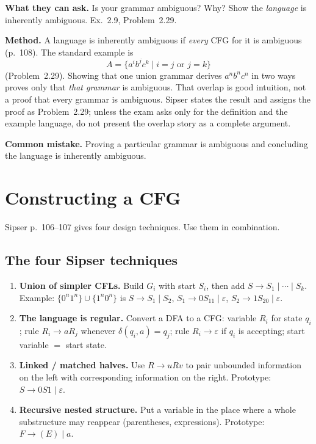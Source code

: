 \documentclass[11pt,a4paper]{article}
\newcommand{\eps}{\varepsilon}
\begin{document}
\textbf{What they can ask.}
Is your grammar ambiguous? Why? Show the \emph{language} is
inherently ambiguous. Ex.~2.9, Problem~2.29.

\textbf{Method.}
A language is inherently ambiguous if \emph{every} CFG for it is
ambiguous (p.~108). The standard example is
\[
  A=\{a^ib^jc^k\mid i=j\text{ or }j=k\}
\]
(Problem~2.29). Showing that one union grammar derives
$a^nb^nc^n$ in two ways proves only that \emph{that grammar} is
ambiguous. That overlap is good intuition, not a proof that every
grammar is ambiguous. Sipser states the result and assigns the
proof as Problem~2.29; unless the exam asks only for the
definition and the example language, do not present the overlap
story as a complete argument.

\textbf{Common mistake.}
Proving a particular grammar is ambiguous and concluding the
language is inherently ambiguous.

\section{Constructing a CFG}
\label{type:cfg-design}

Sipser p.~106--107 gives four design techniques. Use them in
combination.

\subsection{The four Sipser techniques}

\begin{enumerate}
  \item \textbf{Union of simpler CFLs.} Build $G_i$ with start
        $S_i$, then add $S\to S_1\mid\cdots\mid S_k$.
        Example:
        $\{0^n1^n\}\cup\{1^n0^n\}$ is
        $S\to S_1\mid S_2$, $S_1\to 0S_11\mid\eps$,
        $S_2\to 1S_20\mid\eps$.
  \item \textbf{The language is regular.} Convert a DFA to a CFG:
        variable $R_i$ for state $q_i$; rule $R_i\to aR_j$ whenever
        $\delta(q_i,a)=q_j$; rule $R_i\to\eps$ if $q_i$ is accepting;
        start variable $=$ start state.
  \item \textbf{Linked / matched halves.} Use $R\to uRv$ to pair
        unbounded information on the left with corresponding
        information on the right. Prototype: $S\to 0S1\mid\eps$.
  \item \textbf{Recursive nested structure.} Put a variable in the
        place where a whole substructure may reappear (parentheses,
        expressions). Prototype: $F\to(E)\mid a$.
\end{enumerate}
\end{document}
